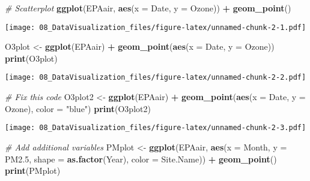 \documentclass[
]{article}
\newenvironment{Shaded}{\begin{snugshade}}{\end{snugshade}}
\newcommand{\CommentTok}[1]{\textcolor[rgb]{0.56,0.35,0.01}{\textit{#1}}}
\newcommand{\DataTypeTok}[1]{\textcolor[rgb]{0.13,0.29,0.53}{#1}}
\newcommand{\FloatTok}[1]{\textcolor[rgb]{0.00,0.00,0.81}{#1}}
\newcommand{\KeywordTok}[1]{\textcolor[rgb]{0.13,0.29,0.53}{\textbf{#1}}}
\newcommand{\NormalTok}[1]{#1}
\newcommand{\OperatorTok}[1]{\textcolor[rgb]{0.81,0.36,0.00}{\textbf{#1}}}
\newcommand{\StringTok}[1]{\textcolor[rgb]{0.31,0.60,0.02}{#1}}
\begin{document}
\begin{Shaded}
\begin{Highlighting}[]
\CommentTok{# Scatterplot}
\KeywordTok{ggplot}\NormalTok{(EPAair, }\KeywordTok{aes}\NormalTok{(}\DataTypeTok{x =}\NormalTok{ Date, }\DataTypeTok{y =}\NormalTok{ Ozone)) }\OperatorTok{+}\StringTok{ }
\StringTok{  }\KeywordTok{geom_point}\NormalTok{()}
\end{Highlighting}
\end{Shaded}

\texttt{[image: 08\_DataVisualization\_files/figure-latex/unnamed-chunk-2-1.pdf]}

\begin{Shaded}
\begin{Highlighting}[]
\NormalTok{O3plot <-}\StringTok{ }\KeywordTok{ggplot}\NormalTok{(EPAair) }\OperatorTok{+}
\StringTok{  }\KeywordTok{geom_point}\NormalTok{(}\KeywordTok{aes}\NormalTok{(}\DataTypeTok{x =}\NormalTok{ Date, }\DataTypeTok{y =}\NormalTok{ Ozone))}
\KeywordTok{print}\NormalTok{(O3plot)}
\end{Highlighting}
\end{Shaded}

\texttt{[image: 08\_DataVisualization\_files/figure-latex/unnamed-chunk-2-2.pdf]}

\begin{Shaded}
\begin{Highlighting}[]
\CommentTok{# Fix this code}
\NormalTok{O3plot2 <-}\StringTok{ }\KeywordTok{ggplot}\NormalTok{(EPAair) }\OperatorTok{+}
\StringTok{  }\KeywordTok{geom_point}\NormalTok{(}\KeywordTok{aes}\NormalTok{(}\DataTypeTok{x =}\NormalTok{ Date, }\DataTypeTok{y =}\NormalTok{ Ozone), }\DataTypeTok{color =} \StringTok{"blue"}\NormalTok{)}
\KeywordTok{print}\NormalTok{(O3plot2)}
\end{Highlighting}
\end{Shaded}

\texttt{[image: 08\_DataVisualization\_files/figure-latex/unnamed-chunk-2-3.pdf]}

\begin{Shaded}
\begin{Highlighting}[]
\CommentTok{# Add additional variables}
\NormalTok{PMplot <-}\StringTok{ }
\StringTok{  }\KeywordTok{ggplot}\NormalTok{(EPAair, }\KeywordTok{aes}\NormalTok{(}\DataTypeTok{x =}\NormalTok{ Month, }\DataTypeTok{y =}\NormalTok{ PM2}\FloatTok{.5}\NormalTok{, }\DataTypeTok{shape =} \KeywordTok{as.factor}\NormalTok{(Year), }\DataTypeTok{color =}\NormalTok{ Site.Name)) }\OperatorTok{+}
\StringTok{  }\KeywordTok{geom_point}\NormalTok{()}
\KeywordTok{print}\NormalTok{(PMplot)}
\end{Highlighting}
\end{Shaded}
\end{document}
